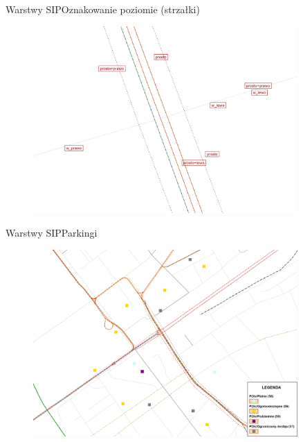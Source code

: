 \documentclass[8pt]{beamer}
\begin{document}
\begin{frame}{Warstwy SIP}{Oznakowanie poziomie (strzałki)}
\begin{figure}\begin{center}
\includegraphics[width=0.9\textwidth]{strzalki}
 \end{center}  \end{figure} 
\end{frame}

\begin{frame}{Warstwy SIP}{Parkingi}
\begin{figure}\begin{center}
\includegraphics[width=0.9\textwidth]{parking}
 \end{center}  \end{figure} 
\end{frame}
\end{document}
